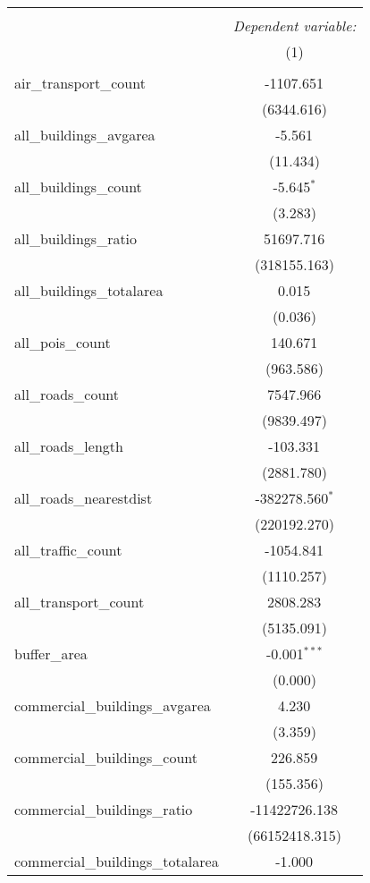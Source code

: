 \begin{table}[!htbp] \centering
\begin{tabular}{@{\extracolsep{5pt}}lc}
\\[-1.8ex]\hline
\hline \\[-1.8ex]
& \multicolumn{1}{c}{\textit{Dependent variable:}} \
\cr \cline{1-2}
\\[-1.8ex] & (1) \\
\hline \\[-1.8ex]
 air_transport_count & -1107.651$^{}$ \\
  & (6344.616) \\
 all_buildings_avgarea & -5.561$^{}$ \\
  & (11.434) \\
 all_buildings_count & -5.645$^{*}$ \\
  & (3.283) \\
 all_buildings_ratio & 51697.716$^{}$ \\
  & (318155.163) \\
 all_buildings_totalarea & 0.015$^{}$ \\
  & (0.036) \\
 all_pois_count & 140.671$^{}$ \\
  & (963.586) \\
 all_roads_count & 7547.966$^{}$ \\
  & (9839.497) \\
 all_roads_length & -103.331$^{}$ \\
  & (2881.780) \\
 all_roads_nearestdist & -382278.560$^{*}$ \\
  & (220192.270) \\
 all_traffic_count & -1054.841$^{}$ \\
  & (1110.257) \\
 all_transport_count & 2808.283$^{}$ \\
  & (5135.091) \\
 buffer_area & -0.001$^{***}$ \\
  & (0.000) \\
 commercial_buildings_avgarea & 4.230$^{}$ \\
  & (3.359) \\
 commercial_buildings_count & 226.859$^{}$ \\
  & (155.356) \\
 commercial_buildings_ratio & -11422726.138$^{}$ \\
  & (66152418.315) \\
 commercial_buildings_totalarea & -1.000$^{}$ \\

\end{tabular}
\end{table}
